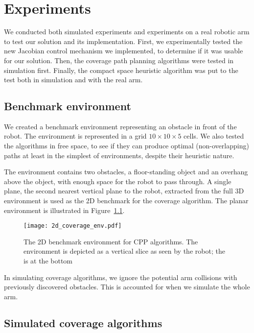 \documentclass[buriama8_dp.tex]{subfiles}
\begin{document}
\chapter{Experiments}

We conducted both simulated experiments and experiments on a real robotic arm to test our solution and its implementation. First, we experimentally tested the new Jacobian control mechanism we implemented, to determine if it was usable for our solution. Then, the coverage path planning algorithms were tested in simulation first. Finally, the compact space heuristic algorithm was put to the test both in simulation and with the real arm.

\section{Benchmark environment}
\label{sec:exp_cpp_env}

We created a benchmark environment representing an obstacle in front of the robot. The environment is represented in a grid \(10 \times 10 \times 5\) cells. We also tested the algorithms in free space, to see if they can produce optimal (non-overlapping) paths at least in the simplest of environments, despite their heuristic nature.

The environment contains two obstacles, a floor-standing object and an overhang above the object, with enough space for the robot to pass through. A single plane, the second nearest vertical plane to the robot, extracted from the full 3D environment is used as the 2D benchmark for the coverage algorithm. The planar environment is illustrated in Figure~\ref{fig:2d_env}.

\begin{figure}[htp]
  \centering
  \texttt{[image: 2d\_coverage\_env.pdf]}
  \caption[2D benchmark environment]{The 2D benchmark environment for CPP algorithms. The environment is depicted as a vertical slice as seen by the robot; the  is at the bottom}
  \label{fig:2d_env}
\end{figure}

In simulating coverage algorithms, we ignore the potential arm collisions with previously discovered obstacles. This is accounted for when we simulate the whole arm.

\section{Simulated coverage algorithms}
\label{sec:exp_sim_coverage}
\end{document}
